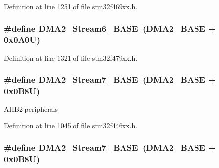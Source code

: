 Definition at line 1251 of file stm32f469xx.\+h.

\subsubsection[{\texorpdfstring{D\+M\+A2\+\_\+\+Stream6\+\_\+\+B\+A\+SE}{DMA2_Stream6_BASE}}]{\setlength{\rightskip}{0pt plus 5cm}\#define D\+M\+A2\+\_\+\+Stream6\+\_\+\+B\+A\+SE~({\bf D\+M\+A2\+\_\+\+B\+A\+SE} + 0x0\+A0\+U)}\hypertarget{group___peripheral__memory__map_ga5e81174c96fd204fa7c82c815e85c8e6}{}\label{group___peripheral__memory__map_ga5e81174c96fd204fa7c82c815e85c8e6}


Definition at line 1321 of file stm32f479xx.\+h.

\subsubsection[{\texorpdfstring{D\+M\+A2\+\_\+\+Stream7\+\_\+\+B\+A\+SE}{DMA2_Stream7_BASE}}]{\setlength{\rightskip}{0pt plus 5cm}\#define D\+M\+A2\+\_\+\+Stream7\+\_\+\+B\+A\+SE~({\bf D\+M\+A2\+\_\+\+B\+A\+SE} + 0x0\+B8\+U)}\hypertarget{group___peripheral__memory__map_gaa9faa708ad2440d24eb1064cba9bb06d}{}\label{group___peripheral__memory__map_gaa9faa708ad2440d24eb1064cba9bb06d}
A\+H\+B2 peripherals 

Definition at line 1045 of file stm32f446xx.\+h.

\subsubsection[{\texorpdfstring{D\+M\+A2\+\_\+\+Stream7\+\_\+\+B\+A\+SE}{DMA2_Stream7_BASE}}]{\setlength{\rightskip}{0pt plus 5cm}\#define D\+M\+A2\+\_\+\+Stream7\+\_\+\+B\+A\+SE~({\bf D\+M\+A2\+\_\+\+B\+A\+SE} + 0x0\+B8\+U)}\hypertarget{group___peripheral__memory__map_gaa9faa708ad2440d24eb1064cba9bb06d}{}\label{group___peripheral__memory__map_gaa9faa708ad2440d24eb1064cba9bb06d}


